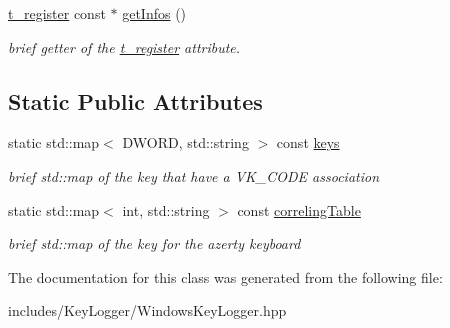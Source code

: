 \begin{DoxyCompactItemize}
\mbox{\label{classspider_1_1_windows_key_logger_aaa419353b5b18b3a93af160c09c4c7cc}} 
\hyperlink{structt__register}{t\+\_\+register} const  $\ast$ \hyperlink{classspider_1_1_windows_key_logger_aaa419353b5b18b3a93af160c09c4c7cc}{get\+Infos} ()
\begin{DoxyCompactList}\small\item\em brief getter of the \hyperlink{structt__register}{t\+\_\+register} attribute. \end{DoxyCompactList}\end{DoxyCompactItemize}
\subsection*{Static Public Attributes}
\begin{DoxyCompactItemize}
\item 
\mbox{\label{classspider_1_1_windows_key_logger_a3ca0d3cf8e09384c3b119320b473f3a2}} 
static std\+::map$<$ D\+W\+O\+RD, std\+::string $>$ const \hyperlink{classspider_1_1_windows_key_logger_a3ca0d3cf8e09384c3b119320b473f3a2}{keys}
\begin{DoxyCompactList}\small\item\em brief std\+::map of the key that have a V\+K\+\_\+\+C\+O\+DE association \end{DoxyCompactList}\item 
\mbox{\label{classspider_1_1_windows_key_logger_a89947f89f001038b6a0de42c6da383f5}} 
static std\+::map$<$ int, std\+::string $>$ const \hyperlink{classspider_1_1_windows_key_logger_a89947f89f001038b6a0de42c6da383f5}{correling\+Table}
\begin{DoxyCompactList}\small\item\em brief std\+::map of the key for the azerty keyboard \end{DoxyCompactList}\end{DoxyCompactItemize}


The documentation for this class was generated from the following file\+:\begin{DoxyCompactItemize}
\item 
includes/\+Key\+Logger/Windows\+Key\+Logger.\+hpp\end{DoxyCompactItemize}
